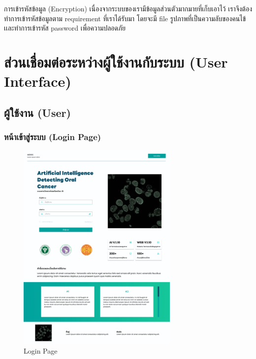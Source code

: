การเข้ารหัสข้อมูล (Encryption) เนื่องจากระบบของเรามีข้อมูลส่วนตัวมากมายที่เก็บเอาไว้ เราจึงต้องทำการเข้ารหัสข้อมูลตาม requirement ที่เราได้รับมา โดยจะมี file รูปภาพที่เป็นความลับของคนไข้เเละทำการเข้ารหัส password เพื่อความปลอดภัย

\section{ส่วนเชื่อมต่อระหว่างผู้ใช้งานกับระบบ (User Interface)}
\subsection{ผู้ใช้งาน (User)}
\subsubsection{หน้าเข้าสู่ระบบ (Login Page)}
\begin{figure}[h]
    \begin{center}
        \includegraphics[width=0.7\textwidth]{img/user/1-login-page.png}
    \end{center}
    \caption[Poem]{Login Page}
    \label{fig:login}
\end{figure}

\newpage
